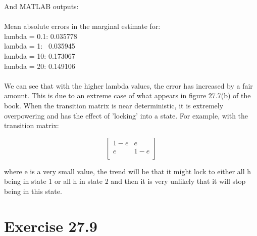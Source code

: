 \documentclass[11pt,a4paper,oneside]{report}
\begin{document}
And MATLAB outputs:\\\\
Mean absolute errors in the marginal estimate for:\\
lambda = 0.1: 0.035778\\
lambda = 1: \ 0.035945\\
lambda = 10: 0.173067\\
lambda = 20: 0.149106\\\\

We can see that with the higher lambda values, the error has increased by a fair amount. This is due to an extreme case of what appears in figure 27.7(b) of the book. When the transition matrix is near deterministic, it is extremely overpowering and has the effect of 'locking' into a state. For example, with the transition matrix:

$$\left[ { \begin{array}{cc} 1-e &  e \\ e & 1-e \\  \end{array} } \right]$$

where e is a very small value, the trend will be that it might lock to either all h being in state 1 or all h in state 2 and then it is very unlikely that it will stop being in this state.

\section*{Exercise 27.9}
\end{document}
